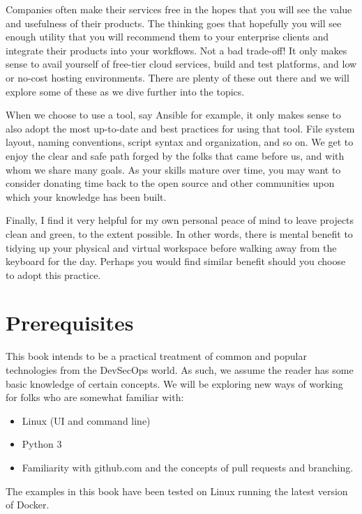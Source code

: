 \justify
Companies often make their services free in the hopes that you will see the value and usefulness of their products. The thinking goes that hopefully you will see enough utility that you will recommend them to your enterprise clients and integrate their products into your workflows. Not a bad trade-off! It only makes sense to avail yourself of free-tier cloud services, build and test platforms, and low or no-cost hosting environments. There are plenty of these out there and we will explore some of these as we dive further into the topics.

\justify
When we choose to use a tool, say Ansible for example, it only makes sense to also adopt the most up-to-date and best practices for using that tool. File system layout, naming conventions, script syntax and organization, and so on. We get to enjoy the clear and safe path forged by the folks that came before us, and with whom we share many goals. As your skills mature over time, you may want to consider donating time back to the open source and other communities upon which your knowledge has been built.

\justify
Finally, I find it very helpful for my own personal peace of mind to leave projects clean and green, to the extent possible. In other words, there is mental benefit to tidying up your physical and virtual workspace before walking away from the keyboard for the day. Perhaps you would find similar benefit should you choose to adopt this practice.

\section{Prerequisites}

\justify
This book intends to be a practical treatment of common and popular technologies from the DevSecOps world. As such, we assume the reader has some basic knowledge of certain concepts. We will be exploring new ways
of working for folks who are somewhat familiar with:

\begin{itemize}
\item
  Linux (UI and command line)
\item Python 3
\item
  Familiarity with github.com and the concepts of pull requests and branching.
\end{itemize}

\justify
The examples in this book have been tested on Linux running the latest
version of Docker.

